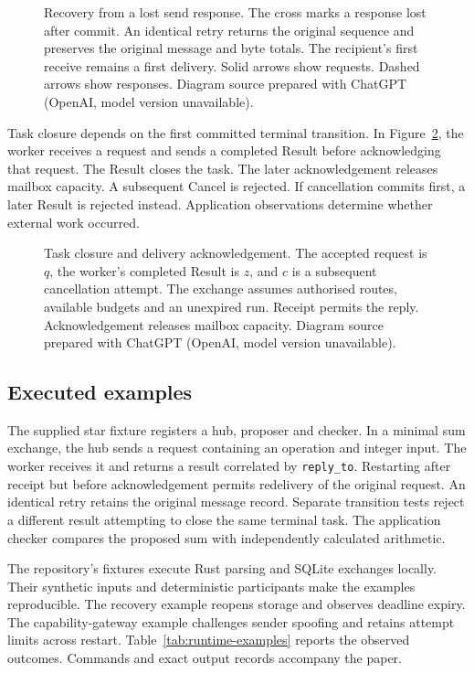 \documentclass[preprint,12pt,a4paper]{elsarticle}
\newcommand{\code}[1]{\texttt{#1}}
\newcommand{\aifigure}{Diagram source prepared with ChatGPT (OpenAI, model version unavailable).}
\begin{document}
\begin{figure}[htbp]
\centering

\caption{Recovery from a lost send response. The cross marks a response lost after commit. An identical retry returns the original sequence and preserves the original message and byte totals. The recipient's first receive remains a first delivery. Solid arrows show requests. Dashed arrows show responses. \aifigure}\label{fig:delivery-sequence}
\end{figure}

Task closure depends on the first committed terminal transition. In Figure~\ref{fig:task-sequence}, the worker receives a request and sends a completed Result before acknowledging that request. The Result closes the task. The later acknowledgement releases mailbox capacity. A subsequent Cancel is rejected. If cancellation commits first, a later Result is rejected instead. Application observations determine whether external work occurred.

\begin{figure}[htbp]
\centering

\caption{Task closure and delivery acknowledgement. The accepted request is $q$, the worker's completed Result is $z$, and $c$ is a subsequent cancellation attempt. The exchange assumes authorised routes, available budgets and an unexpired run. Receipt permits the reply. Acknowledgement releases mailbox capacity. \aifigure}\label{fig:task-sequence}
\end{figure}

\subsection{Executed examples}
The supplied star fixture registers a hub, proposer and checker. In a minimal sum exchange, the hub sends a request containing an operation and integer input. The worker receives it and returns a result correlated by \code{reply\_to}. Restarting after receipt but before acknowledgement permits redelivery of the original request. An identical retry retains the original message record. Separate transition tests reject a different result attempting to close the same terminal task. The application checker compares the proposed sum with independently calculated arithmetic.

The repository's fixtures execute Rust parsing and SQLite exchanges locally. Their synthetic inputs and deterministic participants make the examples reproducible. The recovery example reopens storage and observes deadline expiry. The capability-gateway example challenges sender spoofing and retains attempt limits across restart. Table~\ref{tab:runtime-examples} reports the observed outcomes. Commands and exact output records accompany the paper.
\end{document}
